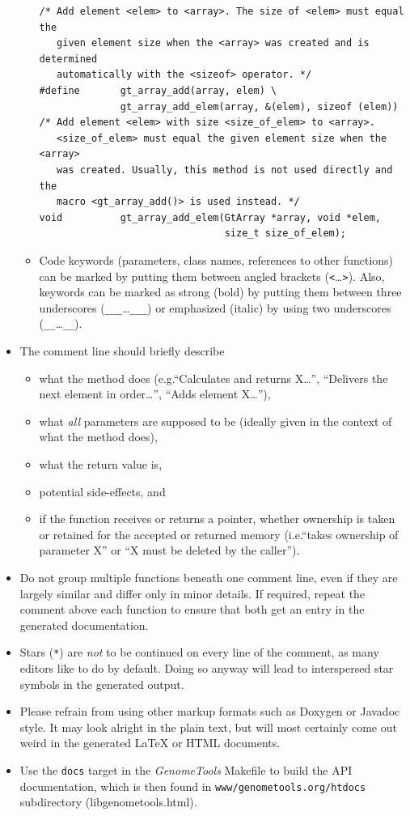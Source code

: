 \documentclass[11pt,final]{article}
\newcommand{\keyword}[1]{\lstinline{#1}}
\newcommand{\Gt}[0]{\emph{GenomeTools}\xspace}
\begin{document}
\begin{itemize}
\begin{itemize}
\begin{lstlisting}
/* Add element <elem> to <array>. The size of <elem> must equal the
   given element size when the <array> was created and is determined
   automatically with the <sizeof> operator. */
#define       gt_array_add(array, elem) \
              gt_array_add_elem(array, &(elem), sizeof (elem))
/* Add element <elem> with size <size_of_elem> to <array>.
   <size_of_elem> must equal the given element size when the <array>
   was created. Usually, this method is not used directly and the
   macro <gt_array_add()> is used instead. */
void          gt_array_add_elem(GtArray *array, void *elem,
                                size_t size_of_elem);
\end{lstlisting}
\item
Code keywords (parameters, class names, references to other functions) can be
marked by putting them between angled brackets (\keyword{<}\dots\keyword{>}).
Also, keywords can be marked as strong (bold) by putting them between
three underscores (\keyword{___}\dots\keyword{___}) or emphasized (italic) by
using two underscores (\keyword{__}\dots\keyword{__}).
\end{itemize}
\item
The comment line should briefly describe
\begin{itemize}
\item
what the method does (e.g.\@ ``Calculates and returns X\dots'',
``Delivers the next element in order\dots'', ``Adds element X\dots''),
\item
what \emph{all} parameters are supposed to be (ideally given in the context of
what the method does),
\item
what the return value is,
\item
potential side-effects, and
\item
if the function receives or returns a pointer, whether ownership is taken or
retained for the accepted or returned memory (i.e.\@ ``takes ownership of
parameter X'' or ``X must be deleted by the caller'').
\end{itemize}
\item
Do not group multiple functions beneath one comment line, even if they are
largely similar and differ only in minor details. If required, repeat the
comment above each function to ensure that both get an entry in the generated
documentation.
\item
Stars (\keyword{*}) are \emph{not} to be continued on every line of the comment,
as many editors like to do by default. Doing so anyway will lead to interspersed
star symbols in the generated output.
\item
Please refrain from using other markup formats such as Doxygen or Javadoc style.
It may look alright in the plain text, but will most certainly come out weird in
the generated LaTeX or HTML documents.
\item
Use the \keyword{docs} target in the \Gt Makefile to build the API
documentation, which is then found in \keyword{www/genometools.org/htdocs}
subdirectory (libgenometools.html).
\end{itemize}
\end{document}
